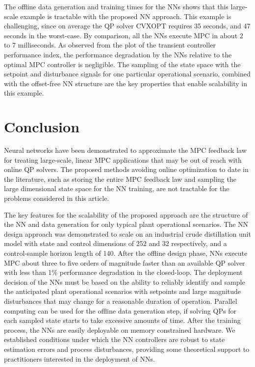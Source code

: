 \documentclass[preprint,5p, twocolumn, authoryear]{elsarticle}
\begin{document}
The offline data generation and training times for the NNs shows that this
large-scale example is tractable with the proposed NN approach. This example is
challenging, since on average the QP solver CVXOPT requires 35 seconds, and 47
seconds in the worst-case. By comparison,  
all the NNs execute MPC in about 2 to 7 milliseconds. As observed from the plot
of the transient controller performance index, the performance degradation by
the NNs relative to the optimal MPC controller is negligible. The sampling of
the state space with the setpoint and disturbance signals for one particular
operational scenario, combined with the offset-free NN structure are the key
properties that enable scalability in this example. 

\section{Conclusion} \label{sec:conclusion} 

Neural networks have been demonstrated to approximate the MPC feedback law for
treating large-scale, linear MPC applications that may be out of reach with
online QP solvers. The proposed methods avoiding online optimization to date in
the literature, such as storing the entire MPC feedback law and sampling the
large dimensional state space for the NN training, are not tractable for the
problems considered in this article.

The key features for the scalability of the proposed approach are the structure
of the NN and data generation for only typical plant operational scenarios. The
NN design approach was demonstrated to scale on an industrial crude distillation
unit model with state and control dimensions of 252 and 32 respectively, and a
control-sample horizon length of 140. After the offline design phase, NNs
execute MPC about three to five orders of magnitude faster than an available QP
solver with less than 1$\%$ performance degradation in the closed-loop. The
deployment decision of the NNs must be based on the ability to reliably identify
and sample the anticipated plant operational scenarios with setpoints and large
magnitude disturbances that may change for a reasonable duration of operation.
Parallel computing can be used for the offline data generation step, if solving
QPs for each sampled state starts to take excessive amounts of time. After the
training process, the NNs are easily deployable on memory constrained hardware.
We established conditions under which the NN controllers are robust to state
estimation errors and process disturbances, providing some theoretical support
to practitioners interested in the deployment of NNs.
\end{document}
